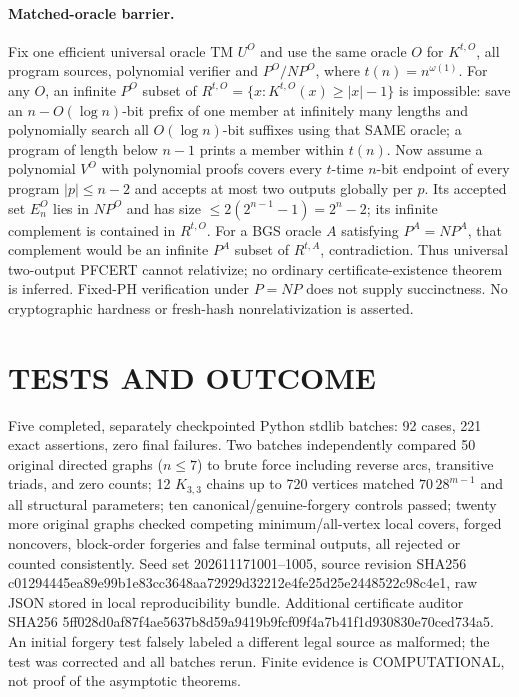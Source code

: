\documentclass[11pt]{article}
\begin{document}
\paragraph{Matched-oracle barrier.}
Fix one efficient universal oracle TM $U^O$ and use the same oracle $O$ for $K^{t,O}$, all program sources, polynomial verifier and $P^O/NP^O$, where $t(n)=n^{\omega(1)}$. For any $O$, an infinite $P^O$ subset of $R^{t,O}=\{x:K^{t,O}(x)\ge|x|-1\}$ is impossible: save an $n-O(\log n)$-bit prefix of one member at infinitely many lengths and polynomially search all $O(\log n)$-bit suffixes using that SAME oracle; a program of length below $n-1$ prints a member within $t(n)$. Now assume a polynomial $V^O$ with polynomial proofs covers every $t$-time $n$-bit endpoint of every program $|p|\le n-2$ and accepts at most two outputs globally per $p$. Its accepted set $E_n^O$ lies in $NP^O$ and has size $\le2(2^{n-1}-1)=2^n-2$; its infinite complement is contained in $R^{t,O}$. For a BGS oracle $A$ satisfying $P^A=NP^A$, that complement would be an infinite $P^A$ subset of $R^{t,A}$, contradiction. Thus universal two-output PFCERT cannot relativize; no ordinary certificate-existence theorem is inferred. Fixed-PH verification under $P=NP$ does not supply succinctness. No cryptographic hardness or fresh-hash nonrelativization is asserted.

\section{TESTS AND OUTCOME}
Five completed, separately checkpointed Python stdlib batches: 92 cases, 221 exact assertions, zero final failures. Two batches independently compared 50 original directed graphs ($n\le7$) to brute force including reverse arcs, transitive triads, and zero counts; 12 $K_{3,3}$ chains up to 720 vertices matched $70\,28^{m-1}$ and all structural parameters; ten canonical/genuine-forgery controls passed; twenty more original graphs checked competing minimum/all-vertex local covers, forged noncovers, block-order forgeries and false terminal outputs, all rejected or counted consistently. Seed set 202611171001--1005, source revision SHA256 c01294445ea89e99b1e83cc3648aa72929d32212e4fe25d25e2448522c98c4e1, raw JSON stored in local reproducibility bundle. Additional certificate auditor SHA256 5ff028d0af87f4ae5637b8d59a9419b9fcf09f4a7b41f1d930830e70ced734a5. An initial forgery test falsely labeled a different legal source as malformed; the test was corrected and all batches rerun. Finite evidence is COMPUTATIONAL, not proof of the asymptotic theorems.
\end{document}
